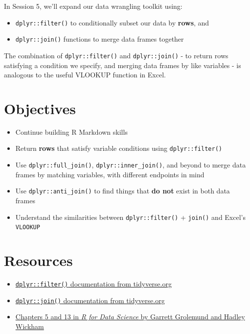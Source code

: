 \documentclass[]{book}
\providecommand{\tightlist}{%
  \setlength{\itemsep}{0pt}\setlength{\parskip}{0pt}}
\begin{document}
In Session 5, we'll expand our data wrangling toolkit using:

\begin{itemize}
\tightlist
\item
  \texttt{dplyr::filter()} to conditionally subset our data by \textbf{rows}, and
\item
  \texttt{dplyr::join()} functions to merge data frames together
\end{itemize}

The combination of \texttt{dplyr::filter()} and \texttt{dplyr::join()} - to return rows satisfying a condition we specify, and merging data frames by like variables - is analogous to the useful VLOOKUP function in Excel.

\hypertarget{objectives-1}{%
\section{Objectives}\label{objectives-1}}

\begin{itemize}
\tightlist
\item
  Continue building R Markdown skills
\item
  Return \textbf{rows} that satisfy variable conditions using \texttt{dplyr::filter()}
\item
  Use \texttt{dplyr::full\_join()}, \texttt{dplyr::inner\_join()}, and beyond to merge data frames by matching variables, with different endpoints in mind
\item
  Use \texttt{dplyr::anti\_join()} to find things that \textbf{do not} exist in both data frames
\item
  Understand the similarities between \texttt{dplyr::filter()} + \texttt{join()} and Excel's \texttt{VLOOKUP}
\end{itemize}

\hypertarget{resources-4}{%
\section{Resources}\label{resources-4}}

\begin{itemize}
\tightlist
\item
  \href{https://dplyr.tidyverse.org/reference/filter.html}{\texttt{dplyr::filter()} documentation from tidyverse.org}
\item
  \href{https://dplyr.tidyverse.org/reference/join.html}{\texttt{dplyr::join()} documentation from tidyverse.org}
\item
  \href{https://r4ds.had.co.nz/}{Chapters 5 and 13 in \emph{R for Data Science} by Garrett Grolemund and Hadley Wickham}
\end{itemize}
\end{document}
